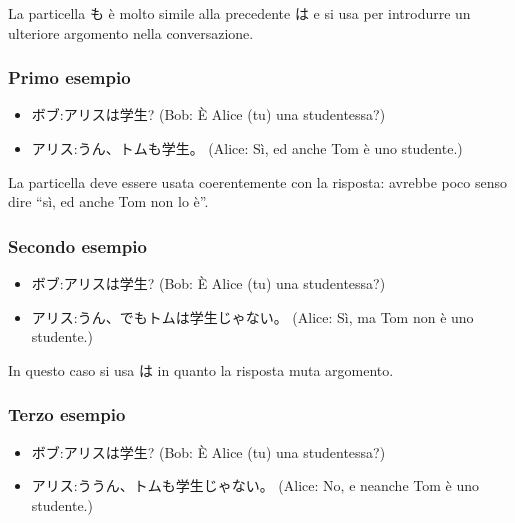 \documentclass{article}
\let\jap\textjapanese
\begin{document}
            La particella \jap{も} è molto simile alla precedente \jap{は} e si usa per introdurre un ulteriore argomento nella
            conversazione.

            \subsubsection*{Primo esempio}

                \begin{itemize}
                    \item \jap{ボブ:アリスは学生?} (Bob: È Alice (tu) una studentessa?)
                    \item \jap{アリス:うん、トムも学生。} (Alice: Sì, ed anche Tom è uno studente.)
                \end{itemize}

                La particella deve essere usata coerentemente con la risposta: avrebbe poco senso dire ``sì, ed anche Tom non lo è''.

            \subsubsection*{Secondo esempio}

                \begin{itemize}
                    \item \jap{ボブ:アリスは学生?} (Bob: È Alice (tu) una studentessa?)
                    \item \jap{アリス:うん、でもトムは学生じゃない。} (Alice: Sì, ma Tom non è uno studente.)
                \end{itemize}

                In questo caso si usa \jap{は} in quanto la risposta muta argomento.

            \subsubsection*{Terzo esempio}

                \begin{itemize}
                    \item \jap{ボブ:アリスは学生?} (Bob: È Alice (tu) una studentessa?)
                    \item \jap{アリス:ううん、トムも学生じゃない。} (Alice: No, e neanche Tom è uno studente.)
                \end{itemize}
\end{document}
